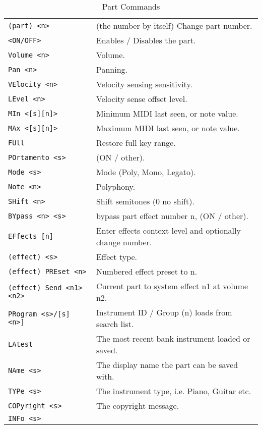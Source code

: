 \begin{center}
\begin{longtable}[l]{ ll}
\caption[Part Commands]{Part Commands} \\
   \label{table:yoshimi_part_commands}
\texttt{(part) <n>} &
   (the number by itself) Change part number.  \\
\texttt{<ON/OFF>} &
   Enables / Disables the part. \\
\texttt{Volume <n>} &
   Volume.  \\
\texttt{Pan <n>} &
   Panning.\\
\texttt{VElocity <n>} &
   Velocity sensing sensitivity. \\
\texttt{LEvel <n>} &
   Velocity sense offset level.  \\
\texttt{MIn <[s][n]>} &
   Minimum MIDI last seen, or note value.   \\
\texttt{MAx <[s][n]>} &
   Maximum MIDI last seen, or note value.   \\
\texttt{FUll} &
   Restore full key range.   \\
\texttt{POrtamento <s>} &
   (ON / other).   \\
\texttt{Mode <s>} &
   Mode (Poly, Mono, Legato). \\
\texttt{Note <n>} &
   Polyphony.  \\
\texttt{SHift <n>} &
   Shift semitones (0 no shift). \\
\texttt{BYpass <n> <s>} &
   bypass part effect number n, (ON / other).  \\
\texttt{EFfects [n]} &
   Enter effects context level and optionally change number.  \\
 \texttt{(effect) <s>} &
   Effect type.   \\
 \texttt{(effect) PREset <n>} &
   Numbered effect preset to n. \\
 \texttt{(effect) Send <n1> <n2>} &
   Current part to system effect n1 at volume n2. \\
\texttt{PRogram <s>/[s] <n>]} &
   Instrument ID / Group (n) loads from search list. \\
\texttt{LAtest} &
   The most recent bank instrument loaded or saved. \\
\texttt{NAme <s>} &
   The display name the part can be saved with. \\
\texttt{TYPe <s>} &
   The instrument type, i.e. Piano, Guitar etc. \\
\texttt{COPyright <s>} &
   The copyright message. \\
\texttt{INFo <s>} &

\end{longtable}
\end{center}
